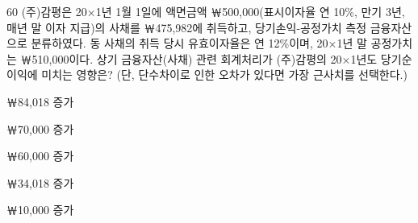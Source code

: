 \begin{question}{60}
(주)감평은 20×1년 1월 1일에 액면금액 ￦500,000(표시이자율 연 10\%, 만기 3년, 매년 말 이자 지급)의 사채를 ￦475,982에 취득하고, 당기손익-공정가치 측정 금융자산으로 분류하였다. 동 사채의 취득 당시 유효이자율은 연 12\%이며, 20×1년 말 공정가치는 ￦510,000이다. 상기 금융자산(사채) 관련 회계처리가 (주)감평의 20×1년도 당기순이익에 미치는 영향은? (단, 단수차이로 인한 오차가 있다면 가장 근사치를 선택한다.)
\begin{choices}
  \item ￦84,018 증가
  \item ￦70,000 증가
  \item ￦60,000 증가
  \item ￦34,018 증가
  \item ￦10,000 증가
\end{choices}
\end{question}
